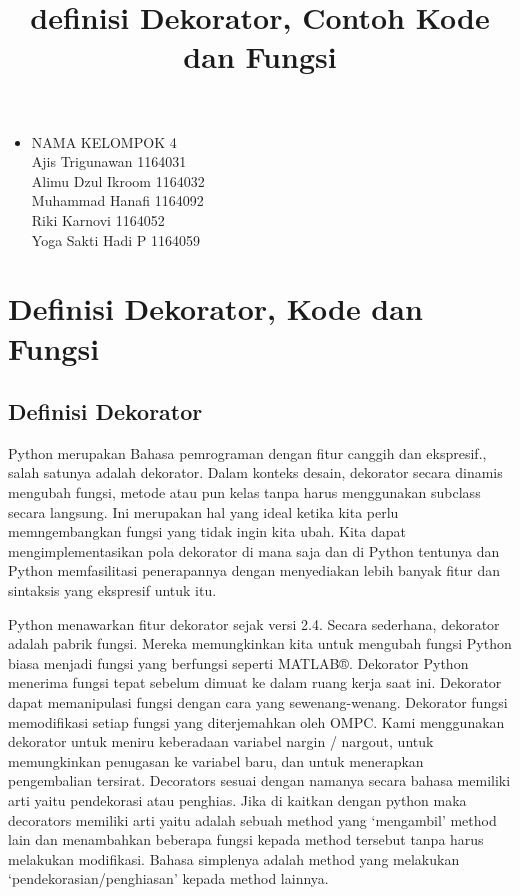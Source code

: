 \documentclass[12pt,a4paper]{article}
\begin{document}
\title{definisi Dekorator, Contoh Kode dan Fungsi}
\maketitle

\begin{itemize}

\item
NAMA KELOMPOK 4\\
Ajis Trigunawan			1164031\\
Alimu Dzul Ikroom		1164032\\
Muhammad Hanafi			1164092\\
Riki Karnovi			1164052\\
Yoga Sakti Hadi P		1164059\\

\end{itemize}

\section{Definisi Dekorator, Kode dan Fungsi}

\subsection{Definisi Dekorator}
Python merupakan Bahasa pemrograman dengan fitur canggih dan ekspresif., salah satunya adalah dekorator. Dalam konteks desain, dekorator secara dinamis mengubah fungsi, metode atau pun kelas tanpa harus menggunakan subclass secara langsung. Ini merupakan hal yang ideal ketika kita perlu memngembangkan fungsi yang tidak ingin kita ubah. Kita dapat mengimplementasikan pola dekorator di mana saja dan di Python tentunya  dan Python memfasilitasi penerapannya dengan menyediakan lebih banyak fitur dan sintaksis yang ekspresif untuk itu.

Python menawarkan fitur dekorator sejak versi 2.4. Secara sederhana, dekorator adalah pabrik fungsi. Mereka memungkinkan kita untuk mengubah fungsi Python biasa menjadi fungsi yang berfungsi seperti MATLAB®. Dekorator Python menerima fungsi tepat sebelum dimuat ke dalam ruang kerja saat ini. Dekorator dapat memanipulasi fungsi dengan cara yang sewenang-wenang. Dekorator fungsi memodifikasi setiap fungsi yang diterjemahkan oleh OMPC. Kami menggunakan dekorator untuk meniru keberadaan variabel nargin / nargout, untuk memungkinkan penugasan ke variabel baru, dan untuk menerapkan pengembalian tersirat.
Decorators sesuai dengan namanya secara bahasa memiliki arti yaitu pendekorasi atau penghias. Jika di kaitkan dengan python maka decorators memiliki arti yaitu adalah sebuah method yang ‘mengambil’ method lain dan menambahkan beberapa fungsi kepada method tersebut tanpa harus melakukan modifikasi. Bahasa simplenya adalah method yang melakukan ‘pendekorasian/penghiasan’ kepada method lainnya.
\end{document}
